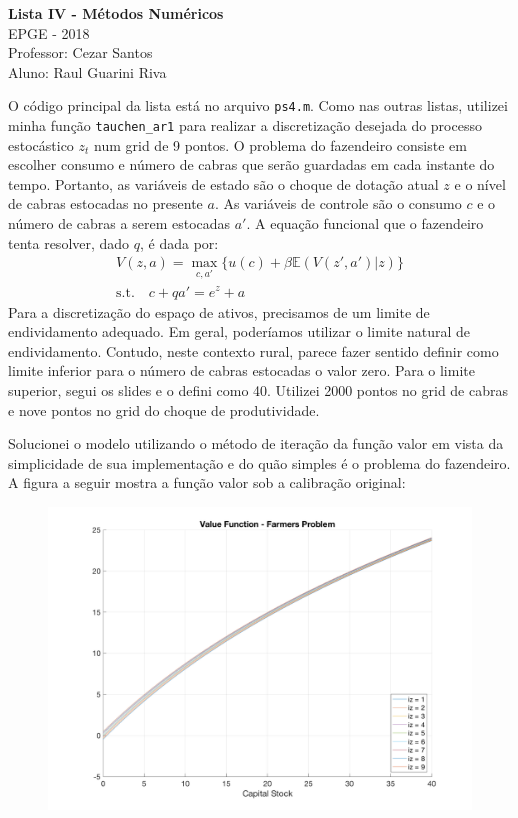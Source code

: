 \documentclass[11pt]{article}
\theoremstyle{definition}
\newcommand{\E}{\mathbb{E}}
\theoremstyle{solution}
\begin{document}
	\begin{center}
		{\Large{\textbf{Lista IV - Métodos Numéricos}}}\\
		\vspace{0.2cm}
		EPGE - 2018\\
		Professor: Cezar Santos\\
		Aluno: Raul Guarini Riva
	\end{center}
	

O código principal da lista está no arquivo \texttt{ps4.m}. Como nas outras listas, utilizei minha função \texttt{tauchen\_ar1} para realizar a discretização desejada do processo estocástico $z_t$ num grid de 9 pontos. O problema do fazendeiro consiste em escolher consumo e número de cabras que serão guardadas em cada instante do tempo. Portanto, as variáveis de estado são o choque de dotação atual $z$ e o nível de cabras estocadas no presente $a$. As variáveis de controle são o consumo $c$ e o número de cabras a serem estocadas $a'$. A equação funcional que o fazendeiro tenta resolver, dado $q$, é dada por:
\begin{gather*}
	V(z, a) = \max\limits_{c, a'} \{ u(c) + \beta\E(V(z', a')|z)\}\\
	\text{s.t.} \quad c + qa' = e^z + a
\end{gather*}
Para a discretização do espaço de ativos, precisamos de um limite de endividamento adequado. Em geral, poderíamos utilizar o limite natural de endividamento. Contudo, neste contexto rural, parece fazer sentido definir como limite inferior para o número de cabras estocadas o valor zero. Para o limite superior, segui os slides e o defini como 40. Utilizei 2000 pontos no grid de cabras e nove pontos no grid do choque de produtividade.

Solucionei o modelo utilizando o método de iteração da função valor em vista da simplicidade de sua implementação e do quão simples é o problema do fazendeiro. A figura a seguir mostra a função valor sob a calibração original:
\begin{figure}[h!]
	\centering
	\includegraphics[scale = 0.22]{value_farmers}
\end{figure}
\end{document}

